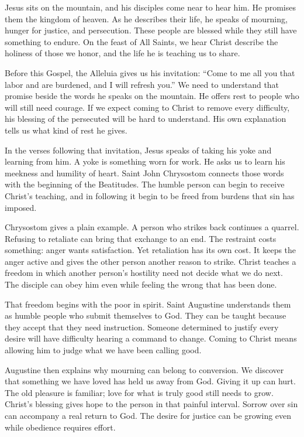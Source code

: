 Jesus sits on the mountain, and his disciples come near to hear him.
He promises them the kingdom of heaven. As he describes their life,
he speaks of mourning, hunger for justice, and persecution. These
people are blessed while they still have something to endure. On the
feast of All Saints, we hear Christ describe the holiness of those we
honor, and the life he is teaching us to share.

Before this Gospel, the Alleluia gives us his invitation:
``Come to me all you that labor and are burdened, and I will refresh
you.'' We need to understand that promise beside the words he speaks
on the mountain. He offers rest to people who will still need courage.
If we expect coming to Christ to remove every difficulty, his blessing
of the persecuted will be hard to understand. His own explanation tells
us what kind of rest he gives.

In the verses following that invitation, Jesus speaks of taking his
yoke and learning from him. A yoke is something worn for work. He asks
us to learn his meekness and humility of heart. Saint John Chrysostom
connects those words with the beginning of the Beatitudes. The humble
person can begin to receive Christ's teaching, and in following it
begin to be freed from burdens that sin has imposed.

Chrysostom gives a plain example. A person who strikes back continues
a quarrel. Refusing to retaliate can bring that exchange to an end.
The restraint costs something: anger wants satisfaction. Yet
retaliation has its own cost. It keeps the anger active and gives
the other person another reason to strike. Christ teaches a freedom
in which another person's hostility need not decide what we do next.
The disciple can obey him even while feeling the wrong that has
been done.

That freedom begins with the poor in spirit. Saint Augustine
understands them as humble people who submit themselves to God.
They can be taught because they accept that they need instruction.
Someone determined to justify every desire will have difficulty
hearing a command to change. Coming to Christ means allowing him
to judge what we have been calling good.

Augustine then explains why mourning can belong to conversion.
We discover that something we have loved has held us away from God.
Giving it up can hurt. The old pleasure is familiar; love for what
is truly good still needs to grow. Christ's blessing gives hope to
the person in that painful interval. Sorrow over sin can accompany
a real return to God. The desire for justice can be growing even
while obedience requires effort.

